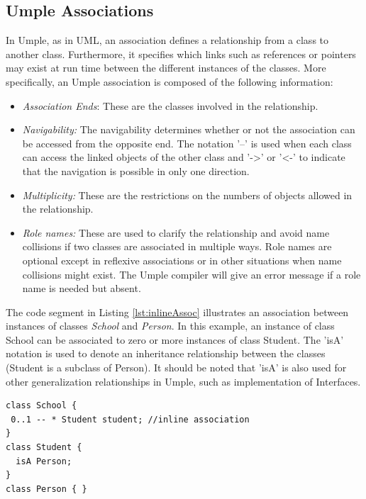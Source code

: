 \subsection{Umple Associations}
\label{subsection:associations}
In Umple, as in UML, an association defines a relationship from a class to another class. Furthermore, it specifies which links such as references or pointers may exist at run time between the different instances of the classes.
More specifically, an Umple association is composed of the following information:

\begin{itemize}

\item \textit{Association Ends}: These are the classes involved in the relationship.

\item \textit{Navigability:} The navigability determines whether or not the association can be accessed from the opposite end. The notation '--' is used when each class can access the linked objects of the other class and '-\textgreater{}' or '\textless{}-' to indicate that the navigation is possible in only one direction.

\item \textit{Multiplicity:} These are the restrictions on the numbers of objects allowed in the relationship.

\item \textit{Role names:} These are used to clarify the relationship and avoid name collisions if two classes are associated in multiple ways. Role names are optional except in reflexive associations or in other situations when name collisions might exist. The Umple compiler will give an error message if a role name is needed but absent.
\end{itemize}

The code segment in Listing \ref{lst:inlineAssoc} illustrates an association between instances of classes \emph{School} and \emph{Person}. In this example, an instance of class School can be associated to zero or more instances of class Student. The 'isA' notation is used to denote an inheritance relationship between the classes (Student is a subclass of Person). It should be noted that 'isA' is also used for other generalization relationships in Umple, such as implementation of Interfaces.

\begin{lstlisting}[style=umplePlain, caption=An example of an inline Umple Association, label=lst:inlineAssoc]
class School {
 0..1 -- * Student student; //inline association
}
class Student {
  isA Person;
}
class Person { }
\end{lstlisting}

